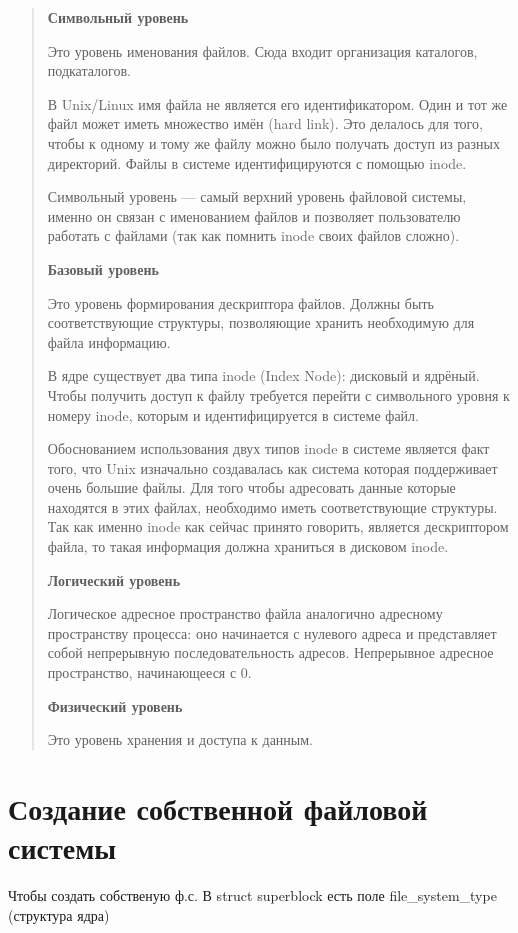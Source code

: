 \begin{quote}
\textbf{Символьный уровень}

Это уровень именования файлов. Сюда входит организация каталогов, подкаталогов.

В Unix/Linux имя файла не является его идентификатором. Один и тот же файл может иметь множество имён (hard link). Это делалось для того, чтобы к одному и тому же файлу можно было получать доступ из разных директорий. Файлы в системе идентифицируются с помощью inode.

Символьный уровень — самый верхний уровень файловой системы, именно он связан с именованием файлов и позволяет пользователю работать с файлами (так как помнить inode своих файлов сложно).

\textbf{Базовый уровень}

Это уровень формирования дескриптора файлов. Должны быть соответствующие структуры, позволяющие хранить необходимую для файла информацию.

В ядре существует два типа inode (Index Node): дисковый и ядрёный. Чтобы получить доступ к файлу требуется перейти с символьного уровня к номеру inode, которым и идентифицируется в системе файл.

Обоснованием использования двух типов inode в системе является факт того, что Unix изначально создавалась как система которая поддерживает очень большие файлы. Для того чтобы адресовать данные которые находятся в этих файлах, необходимо иметь соответствующие структуры. Так как именно inode как сейчас принято говорить, является дескриптором файла, то такая информация должна храниться в дисковом inode.

\textbf{Логический уровень}

Логическое адресное пространство файла аналогично адресному пространству процесса: оно начинается с нулевого адреса и представляет собой непрерывную последовательность адресов. Непрерывное адресное пространство, начинающееся с 0.

\textbf{Физический уровень}

Это уровень хранения и доступа к данным.

\end{quote}

\section{Создание собственной файловой системы}

Чтобы создать собственую ф.с. В struct superblock есть поле file\_system\_type (структура ядра)

